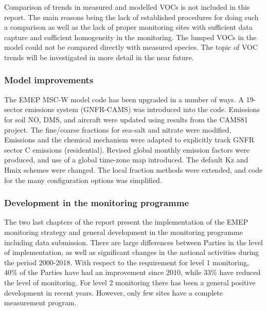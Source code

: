 Comparison of trends in measured and modelled VOCs is not included in this report. The main reasons being the lack of established procedures for doing such a comparison as well as the lack of proper monitoring sites with sufficient data capture and sufficient homogeneity in the monitoring. The lumped VOCs in the model could not be compared directly with measured species. The topic of VOC trends will be investigated in more detail in the near future.  















\subsubsection*{Model improvements} %

The EMEP MSC-W model code has been upgraded in a number of ways. 
A 19-sector emissions system (GNFR-CAMS) was introduced into the code. Emissions for soil NO, DMS, and aircraft were updated using results from the CAMS81 project. 
The  fine/coarse fractions for sea-salt and nitrate were modified. Emissions and the chemical mechanism were adapted to explicitly track GNFR sector C emissions (residential). Revised global monthly emission factors were produced, and use of a global time-zone map introduced. The default Kz and Hmix schemes were changed. The local fraction methods were extended, and code for the many configuration options was simplified. 




\subsubsection*{Development in the monitoring programme} %
The two last chapters of the report present the implementation of the EMEP monitoring strategy and general development in the monitoring programme including data submission. There are large differences between Parties in the level of implementation, as well as significant changes in the national activities during the period 2000-2018. With respect to the requirement for level 1 monitoring, 40\% of the Parties have had an improvement since 2010, while 33\% have reduced the level of monitoring. For level 2 monitoring there has been a general positive development in recent years. However, only few sites have a complete measurement program.

